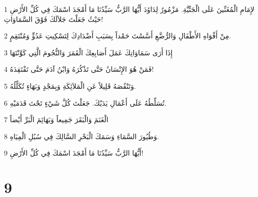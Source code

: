 \par 1 لإِمَامِ الْمُغَنِّينَ عَلَى الْجَتِّيَّةِ. مَزْمُورٌ لِدَاوُدَ أَيُّهَا الرَّبُّ سَيِّدُنَا مَا أَمْجَدَ اسْمَكَ فِي كُلِّ الأَرْضِ حَيْثُ جَعَلْتَ جَلاَلَكَ فَوْقَ السَّمَاوَاتِ!
\par 2 مِنْ أَفْوَاهِ الأَطْفَالِ وَالرُّضَّعِ أَسَّسْتَ حَمْداً بِسَبَبِ أَضْدَادِكَ لِتَسْكِيتِ عَدُوٍّ وَمُنْتَقِمٍ.
\par 3 إِذَا أَرَى سَمَاوَاتِكَ عَمَلَ أَصَابِعِكَ الْقَمَرَ وَالنُّجُومَ الَّتِي كَوَّنْتَهَا
\par 4 فَمَنْ هُوَ الإِنْسَانُ حَتَّى تَذْكُرَهُ وَابْنُ آدَمَ حَتَّى تَفْتَقِدَهُ!
\par 5 وَتَنْقُصَهُ قَلِيلاً عَنِ الْمَلاَئِكَةِ وَبِمَجْدٍ وَبَهَاءٍ تُكَلِّلُهُ.
\par 6 تُسَلِّطُهُ عَلَى أَعْمَالِ يَدَيْكَ. جَعَلْتَ كُلَّ شَيْءٍ تَحْتَ قَدَمَيْهِ.
\par 7 الْغَنَمَ وَالْبَقَرَ جَمِيعاً وَبَهَائِمَ الْبَرِّ أَيْضاً
\par 8 وَطُيُورَ السَّمَاءِ وَسَمَكَ الْبَحْرِ السَّالِكَ فِي سُبُلِ الْمِيَاهِ.
\par 9 أَيُّهَا الرَّبُّ سَيِّدُنَا مَا أَمْجَدَ اسْمَكَ فِي كُلِّ الأَرْضِ!

\chapter{9}

